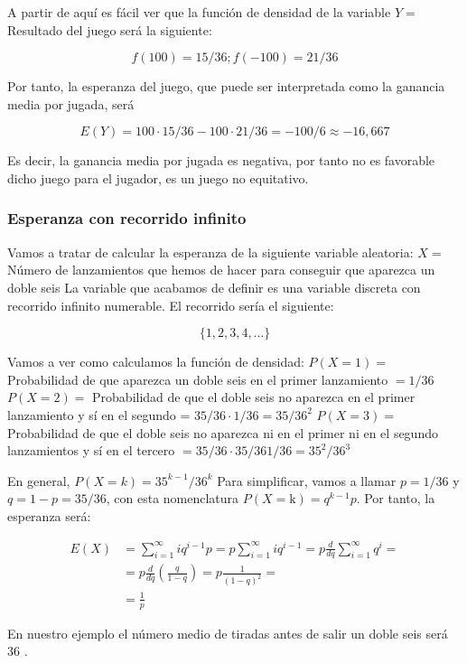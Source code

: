 \documentclass[
]{article}
\begin{document}
A partir de aquí es fácil ver que la función de densidad de la variable
\(Y=\) Resultado del juego será la siguiente:

\[
f(100)=15 / 36 ; f(-100)=21 / 36
\]

Por tanto, la esperanza del juego, que puede ser interpretada como la
ganancia media por jugada, será

\[
E(Y)=100 \cdot 15 / 36-100 \cdot 21 / 36=-100 / 6 \approx-16,667
\]

Es decir, la ganancia media por jugada es negativa, por tanto no es
favorable dicho juego para el jugador, es un juego no equitativo.

\subsubsection{Esperanza con recorrido infinito}\label{esperanza-con-recorrido-infinito}

Vamos a tratar de calcular la esperanza de la siguiente variable
aleatoria: \(X=\) Número de lanzamientos que hemos de hacer para conseguir
que aparezca un doble seis La variable que acabamos de definir es una
variable discreta con recorrido infinito numerable. El recorrido sería
el siguiente:

\[
\{1,2,3,4, \ldots\}
\]

Vamos a ver como calculamos la función de densidad: \(P(X=1)=\)
Probabilidad de que aparezca un doble seis en el primer lanzamiento
\(=1 / 36\) \(P(X=2)=\) Probabilidad de que el doble seis no aparezca en el
primer lanzamiento y sí en el segundo =
\(35 / 36 \cdot 1 / 36=35 / 36^{2}\) \(P(X=3)=\) Probabilidad de que el
doble seis no aparezca ni en el primer ni en el segundo lanzamientos y
sí en el tercero \(=35 / 36 \cdot 35 / 361 / 36=35^{2} / 36^{3}\)

En general, \(P(X=k)=35^{k-1} / 36^{k}\) Para simplificar, vamos a llamar
\(p=1 / 36\) y \(q=1-p=35 / 36\), con esta nomenclatura
\(P(X=\mathrm{k})=q^{k-1} p\). Por tanto, la esperanza será:

\[
\begin{aligned}
E(X)& =\sum_{i=1}^{\infty} i q^{i-1} p=p \sum_{i=1}^{\infty} i q^{i-1}=p \frac{d}{d q} \sum_{i=1}^{\infty} q^{i}= \\ 
&= p \frac{d}{d q}\left(\frac{q}{1-q}\right)=p \frac{1}{(1-q)^{2}}=\\
& = \frac{1}{p}
\end{aligned}
\]

En nuestro ejemplo el número medio de tiradas antes de salir un doble
seis será 36 .
\end{document}
